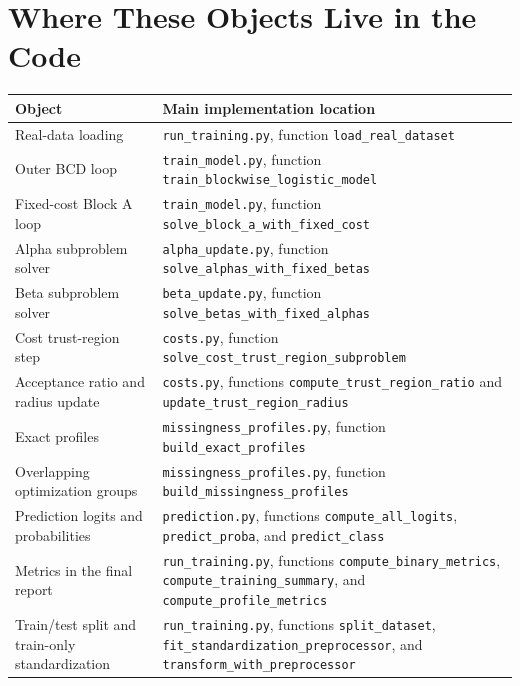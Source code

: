 \documentclass[11pt]{article}
\begin{document}
\section{Where These Objects Live in the Code}
\begin{longtable}{>{\raggedright\arraybackslash}p{} >{\raggedright\arraybackslash}p{}}
\toprule
\textbf{Object} & \textbf{Main implementation location} \\
\midrule
\endhead
Real-data loading & \texttt{run\_training.py}, function \texttt{load\_real\_dataset} \\
Outer BCD loop & \texttt{train\_model.py}, function \texttt{train\_blockwise\_logistic\_model} \\
Fixed-cost Block A loop & \texttt{train\_model.py}, function \texttt{solve\_block\_a\_with\_fixed\_cost} \\
Alpha subproblem solver & \texttt{alpha\_update.py}, function \texttt{solve\_alphas\_with\_fixed\_betas} \\
Beta subproblem solver & \texttt{beta\_update.py}, function \texttt{solve\_betas\_with\_fixed\_alphas} \\
Cost trust-region step & \texttt{costs.py}, function \texttt{solve\_cost\_trust\_region\_subproblem} \\
Acceptance ratio and radius update & \texttt{costs.py}, functions \texttt{compute\_trust\_region\_ratio} and \texttt{update\_trust\_region\_radius} \\
Exact profiles & \texttt{missingness\_profiles.py}, function \texttt{build\_exact\_profiles} \\
Overlapping optimization groups & \texttt{missingness\_profiles.py}, function \texttt{build\_missingness\_profiles} \\
Prediction logits and probabilities & \texttt{prediction.py}, functions \texttt{compute\_all\_logits}, \texttt{predict\_proba}, and \texttt{predict\_class} \\
Metrics in the final report & \texttt{run\_training.py}, functions \texttt{compute\_binary\_metrics}, \texttt{compute\_training\_summary}, and \texttt{compute\_profile\_metrics} \\
Train/test split and train-only standardization & \texttt{run\_training.py}, functions \texttt{split\_dataset}, \texttt{fit\_standardization\_preprocessor}, and \texttt{transform\_with\_preprocessor} \\
\bottomrule
\end{longtable}
\end{document}

